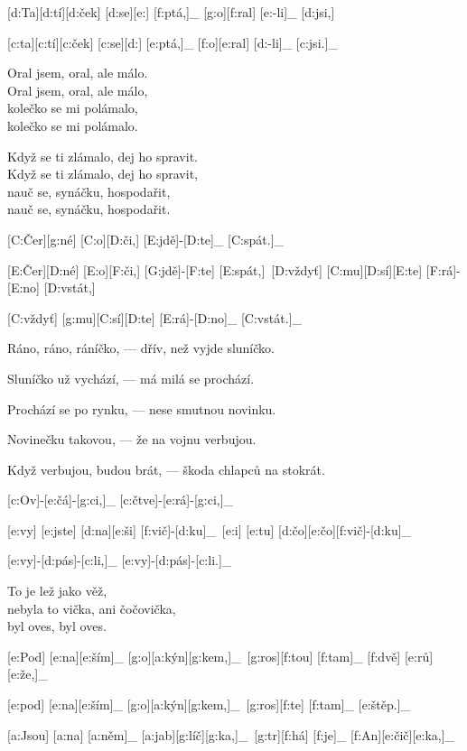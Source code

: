 [d:Ta][d:tí][d:ček] [d:se][e:] [f:ptá,]_ [g:o][f:ral] [e:-li]_ [d:jsi,]\

[c:ta][c:tí][c:ček] [c:se][d:] [e:ptá,]_ [f:o][e:ral] [d:-li]_ [c:jsi.]_\

Oral jsem, oral, ale málo.\\
Oral jsem, oral, ale málo,\\
kolečko se mi polámalo,\\
kolečko se mi polámalo.

Když se ti zlámalo, dej ho spravit.\\
Když se ti zlámalo, dej ho spravit,\\
nauč se, synáčku, hospodařit,\\
nauč se, synáčku, hospodařit.



[C:Čer][g:né] [C:o][D:či,] [E:jdě]-[D:te]_ [C:spát.]_\

[E:Čer][D:né] [E:o][F:či,] [G:jdě]-[F:te] [E:spát,]\
[D:vždyť] [C:mu][D:sí][E:te] [F:rá]-[E:no] [D:vstát,]\

[C:vždyť] [g:mu][C:sí][D:te] [E:rá]-[D:no]_ [C:vstát.]_\

Ráno, ráno, ráníčko, --- dřív, než vyjde sluníčko.

Sluníčko už vychází, --- má milá se prochází.

Prochází se po rynku, --- nese smutnou novinku.

Novinečku takovou, --- že na vojnu verbujou.

Když verbujou, budou brát, --- škoda chlapců na stokrát.



[c:Ov]-[e:čá]-[g:ci,]_
[c:čtve]-[e:rá]-[g:ci,]_\

[e:vy] [e:jste] [d:na][e:ši] [f:vič]-[d:ku]_\
[e:i] [e:tu] [d:čo][e:čo][f:vič]-[d:ku]_\

[e:vy]-[d:pás]-[c:li,]_
[e:vy]-[d:pás]-[c:li.]_\

To je lež jako věž,\\
nebyla to vička, ani čočovička,\\
byl oves, byl oves.



[e:Pod] [e:na][e:ším]_ [g:o][a:kýn][g:kem,]_\
[g:ros][f:tou] [f:tam]_ [f:dvě] [e:rů][e:že,]_\

[e:pod] [e:na][e:ším]_ [g:o][a:kýn][g:kem,]_\
[g:ros][f:te] [f:tam]_ [e:štěp.]_\

[a:Jsou] [a:na] [a:něm]_ [a:jab][g:líč][g:ka,]_\
[g:tr][f:há] [f:je]_ [f:An][e:čič][e:ka,]_\

